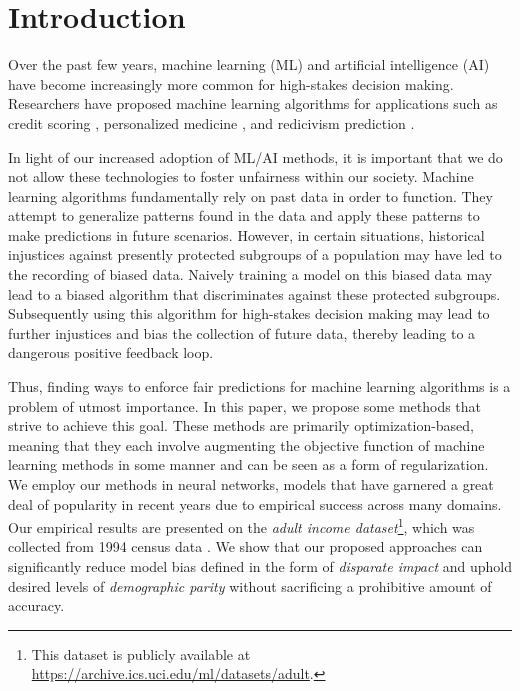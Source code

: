 \documentclass{article}
\begin{document}
\section{Introduction}
\label{submission}

Over the past few years, machine learning (ML) and artificial intelligence (AI) have become increasingly more common for high-stakes decision making.  Researchers have proposed machine learning algorithms for applications such as credit scoring \citep{huang2007credit}, personalized medicine \citep{poplin2018prediction}, and redicivism prediction \citep{tollenaar2013method}.  

In light of our increased adoption of ML/AI methods, it is important that we do not allow these technologies to foster unfairness within our society.  Machine learning algorithms fundamentally rely on past data in order to function.   They attempt to generalize patterns found in the data and apply these patterns to make predictions in future scenarios.  However, in certain situations, historical injustices against presently protected subgroups of a population may have led to the recording of biased data.  Naively training a model on this biased data may lead to a biased algorithm that discriminates against these protected subgroups.  Subsequently using this algorithm for high-stakes decision making may lead to further injustices and bias the collection of future data, thereby leading to a dangerous positive feedback loop.  

Thus, finding ways to enforce fair predictions for machine learning algorithms is a problem of utmost importance.  In this paper, we propose some methods that strive to achieve this goal.  These methods are primarily optimization-based, meaning that they each involve augmenting the objective function of machine learning methods in some manner and can be seen as a form of regularization.  We employ our methods in neural networks, models that have garnered a great deal of popularity in recent years due to empirical success across many domains.  Our empirical results are presented on the \emph{adult income dataset}\footnote{This dataset is publicly available at \url{https://archive.ics.uci.edu/ml/datasets/adult}.}, which was collected from 1994 census data \citep{kohavi1996scaling}.  We show that our proposed approaches can significantly reduce model bias defined in the form of \emph{disparate impact} and uphold desired levels of \emph{demographic parity} without sacrificing a prohibitive amount of accuracy.             
\end{document}

